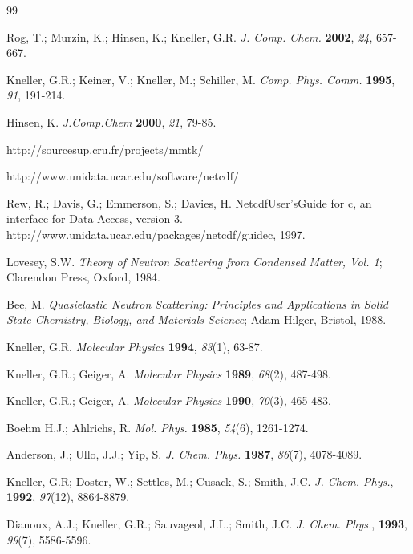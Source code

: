 \documentclass[a4paper,11pt]{article}
\begin{document}
\newpage
{}
{}
\begin{thebibliography}{99}

 Rog, T.; Murzin, K.; Hinsen, K.; Kneller, G.R. \textit{J. Comp. Chem.} \textbf{2002}, \textit{24}, 657-667.

 Kneller, G.R.; Keiner, V.; Kneller, M.; Schiller, M. \textit{Comp. Phys. Comm.} \textbf{1995}, \textit{91}, 191-214.

 Hinsen, K. \textit{J.Comp.Chem} \textbf{2000}, \textit{21}, 79-85.

 http://sourcesup.cru.fr/projects/mmtk/

 http://www.unidata.ucar.edu/software/netcdf/

 Rew, R.; Davis, G.; Emmerson, S.; Davies, H. NetcdfUser'sGuide for c, an interface for Data Access, version 3. http://www.unidata.ucar.edu/packages/netcdf/guidec, 1997.

 Lovesey, S.W. \textit{Theory of Neutron Scattering from Condensed Matter, Vol. 1}; Clarendon Press, Oxford, 1984.

 Bee, M. \textit{Quasielastic Neutron Scattering: Principles and Applications in Solid State Chemistry, Biology, and Materials Science}; Adam Hilger, Bristol, 1988.

 Kneller, G.R. \textit{Molecular Physics} \textbf{1994}, \textit{83}(1), 63-87.

 Kneller, G.R.; Geiger, A. \textit{Molecular Physics} \textbf{1989}, \textit{68}(2), 487-498.

 Kneller, G.R.; Geiger, A. \textit{Molecular Physics} \textbf{1990}, \textit{70}(3), 465-483.

 Boehm H.J.; Ahlrichs, R. \textit{Mol. Phys.} \textbf{1985}, \textit{54}(6), 1261-1274.

 Anderson, J.; Ullo, J.J.; Yip, S. \textit{J. Chem. Phys.} \textbf{1987}, \textit{86}(7), 4078-4089.

 Kneller, G.R; Doster, W.; Settles, M.; Cusack, S.; Smith, J.C. \textit{J. Chem. Phys.}, \textbf{1992}, \textit{97}(12), 8864-8879.

 Dianoux, A.J.; Kneller, G.R.; Sauvageol, J.L.; Smith, J.C. \textit{J. Chem. Phys.}, \textbf{1993}, \textit{99}(7), 5586-5596.


\end{thebibliography}
\end{document}
